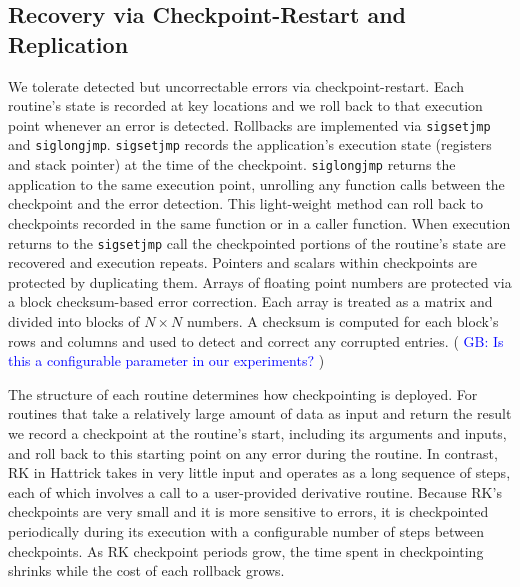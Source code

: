 \documentclass[10pt, conference, compsocconf]{IEEEtran}
\newcommand{\greg}[1]{%
  \textcolor{blue}{GB: #1}
}
\begin{document}
\subsection{Recovery via Checkpoint-Restart and \\Replication}
\label{sec:res_tech:cr}
We tolerate detected but uncorrectable errors via checkpoint-restart.
Each routine's state is recorded at key locations and we roll back to that execution point whenever an error is detected.
Rollbacks are implemented via \texttt{sigsetjmp} and \texttt{siglongjmp}. %
\texttt{sigsetjmp} records the application's execution state (registers and stack pointer) at the time of the checkpoint.
\texttt{siglongjmp} returns the application to the same execution point, unrolling any function calls between the checkpoint and the error detection.
This light-weight method can roll back to checkpoints recorded in the same function or in a caller function.
When execution returns to the \texttt{sigsetjmp} call the checkpointed portions of the routine's state are recovered and execution repeats.
Pointers and scalars within checkpoints are protected by duplicating them.
Arrays of floating point numbers are protected via a block checksum-based error correction.
Each array is treated as a matrix and divided into blocks of $N \times N$ numbers.
A checksum is computed for each block's rows and columns and used to detect and correct any corrupted entries.
(\greg{Is this a configurable parameter in our experiments?})

The structure of each routine determines how checkpointing is deployed.
For routines that take a relatively large amount of data as input and return the result we record a checkpoint at the routine's start, including its arguments and inputs, and roll back to this starting point on any error during the routine.
In contrast, RK in Hattrick takes in very little input and operates as a long sequence of steps, each of which involves a call to a user-provided derivative routine.
Because RK's checkpoints are very small and it is more sensitive to errors, it is checkpointed periodically during its execution with a configurable number of steps between checkpoints.
As RK checkpoint periods grow, the time spent in checkpointing shrinks while the cost of each rollback grows.
\end{document}
